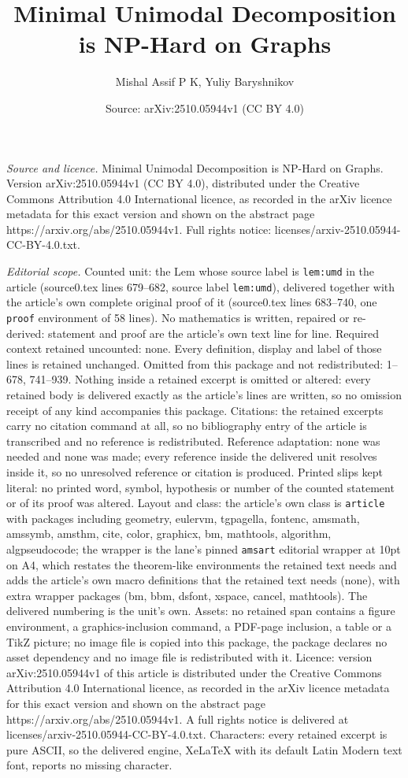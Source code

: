 \documentclass[10pt,a4paper]{amsart}
\title[Minimal Unimodal Decomposition is NP-Hard on Graphs]{Minimal Unimodal Decomposition is NP-Hard on Graphs}
\author{Mishal Assif P K, Yuliy Baryshnikov}
\date{Source: arXiv:2510.05944v1 (CC BY 4.0)}
\begin{document}
\maketitle

\noindent\emph{Source and licence.} Minimal Unimodal Decomposition is NP-Hard on Graphs. Version arXiv:2510.05944v1 (CC BY 4.0), distributed under the Creative Commons Attribution 4.0 International licence, as recorded in the arXiv licence metadata for this exact version and shown on the abstract page https://arxiv.org/abs/2510.05944v1. Full rights notice: licenses/arxiv-2510.05944-CC-BY-4.0.txt.\par\smallskip

\noindent\textit{Editorial scope.} Counted unit: the Lem whose source label is \texttt{lem:umd} in the article (source0.tex lines 679--682, source label \texttt{lem:umd}), delivered together with the article's own complete original proof of it (source0.tex lines 683--740, one \texttt{proof} environment of 58 lines). No mathematics is written, repaired or re-derived: statement and proof are the article's own text line for line. Required context retained uncounted: none. Every definition, display and label of those lines is retained unchanged. Omitted from this package and not redistributed: 1--678, 741--939. Nothing inside a retained excerpt is omitted or altered: every retained body is delivered exactly as the article's lines are written, so no omission receipt of any kind accompanies this package. Citations: the retained excerpts carry no citation command at all, so no bibliography entry of the article is transcribed and no reference is redistributed. Reference adaptation: none was needed and none was made; every reference inside the delivered unit resolves inside it, so no unresolved reference or citation is produced. Printed slips kept literal: no printed word, symbol, hypothesis or number of the counted statement or of its proof was altered. Layout and class: the article's own class is \texttt{article} with packages including geometry, eulervm, tgpagella, fontenc, amsmath, amssymb, amsthm, cite, color, graphicx, bm, mathtools, algorithm, algpseudocode; the wrapper is the lane's pinned \texttt{amsart} editorial wrapper at 10pt on A4, which restates the theorem-like environments the retained text needs and adds the article's own macro definitions that the retained text needs (none), with extra wrapper packages (bm, bbm, dsfont, xspace, cancel, mathtools). The delivered numbering is the unit's own. Assets: no retained span contains a figure environment, a graphics-inclusion command, a PDF-page inclusion, a table or a TikZ picture; no image file is copied into this package, the package declares no asset dependency and no image file is redistributed with it. Licence: version arXiv:2510.05944v1 of this article is distributed under the Creative Commons Attribution 4.0 International licence, as recorded in the arXiv licence metadata for this exact version and shown on the abstract page https://arxiv.org/abs/2510.05944v1. A full rights notice is delivered at licenses/arxiv-2510.05944-CC-BY-4.0.txt. Characters: every retained excerpt is pure ASCII, so the delivered engine, XeLaTeX with its default Latin Modern text font, reports no missing character.
\end{document}
